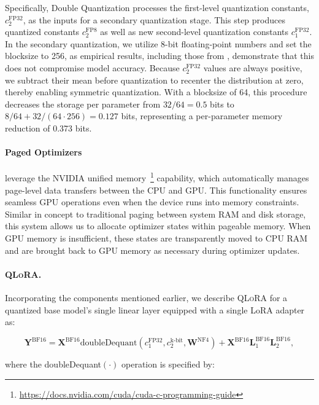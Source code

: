 Specifically, Double Quantization processes the first-level quantization constants, $c_2^{\text{FP32}}$, as the inputs for a secondary quantization stage. This step produces quantized constants $c_2^{\text{FP8}}$ as well as new second-level quantization constants $c_1^{\text{FP32}}$. In the secondary quantization, we utilize 8-bit floating-point numbers and set the blocksize to 256, as empirical results, including those from \citet{dettmers2022case}, demonstrate that this does not compromise model accuracy. Because $c_2^{\text{FP32}}$ values are always positive, we subtract their mean before quantization to recenter the distribution at zero, thereby enabling symmetric quantization. With a blocksize of 64, this procedure decreases the storage per parameter from $32/64 = 0.5$ bits to $8/64 + 32/(64\cdot256) = 0.127$ bits, representing a per-parameter memory reduction of 0.373 bits.

\paragraph{Paged Optimizers} leverage the NVIDIA unified memory~\footnote{\tiny \url{https://docs.nvidia.com/cuda/cuda-c-programming-guide}} capability, which automatically manages page-level data transfers between the CPU and GPU. This functionality ensures seamless GPU operations even when the device runs into memory constraints. Similar in concept to traditional paging between system RAM and disk storage, this system allows us to allocate optimizer states within pageable memory. When GPU memory is insufficient, these states are transparently moved to CPU RAM and are brought back to GPU memory as necessary during optimizer updates.

\paragraph{\textsc{QLoRA}.} Incorporating the components mentioned earlier, we describe \textsc{QLoRA} for a quantized base model's single linear layer equipped with a single LoRA adapter as:

\begin{equation}
    \mathbf{Y}^{\text{BF16}} =  \mathbf{X}^{\text{BF16}} \text{doubleDequant}(c_1^{\text{FP32}}, c_2^{\text{k-bit}}, \mathbf{W}^{\text{NF4}}) + \mathbf{X}^{\text{BF16}}\mathbf{L}^{\text{BF16}}_1\mathbf{L}^{\text{BF16}}_2,
\end{equation}

where the doubleDequant$(\cdot)$ operation is specified by:

